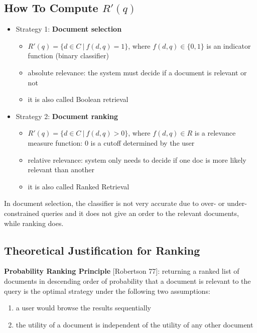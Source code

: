 \documentclass{article}
\begin{document}
\subsection{How To Compute $ R'(q) $}
\begin{itemize}
    \item Strategy 1: \textbf{Document selection}
    \begin{itemize}
        \item $ R'(q) = \{d \in C \ | \ f(d,q) = 1\} $, where $ f(d,q) \in \{0,1\} $ is an indicator function (binary classifier)
        \item absolute relevance: the system must decide if a document is relevant or not
        \item it is also called Boolean retrieval
    \end{itemize}
    \item Strategy 2: \textbf{Document ranking}
    \begin{itemize}
        \item $ R'(q) = \{d \in C \ | \ f(d,q) > 0\} $, where $ f(d,q) \in R $ is a relevance measure function: $ 0 $ is a cutoff determined by the user
        \item relative relevance: system only needs to decide if one doc is more likely relevant than another 
        \item it is also called Ranked Retrieval
    \end{itemize}
\end{itemize}
In document selection, the classifier is not very accurate due to over- or under-constrained queries and it does not give an order to the relevant documents, while ranking does. \\
\subsection{Theoretical Justification for Ranking}
\textbf{Probability Ranking Principle} [Robertson 77]: returning a ranked list of documents in descending order of probability that a document is relevant to the query is the optimal strategy under the following two assumptions: 
\begin{enumerate}
    \item a user would browse the results sequentially
    \item the utility of a document is independent of the utility of any other document 
\end{enumerate}

\newpage
\end{document}
